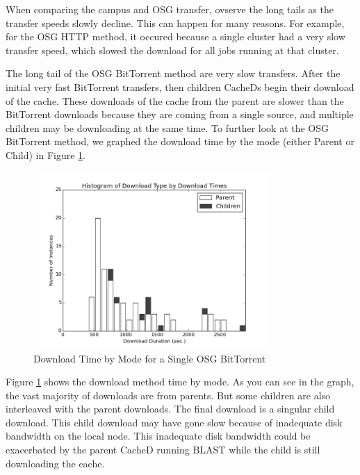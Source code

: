 When comparing the campus and OSG transfer, ovserve the long tails as the transfer speeds slowly decline.  This can happen for many reasons.  For example, for the OSG HTTP method, it occured because a single cluster had a very slow transfer speed, which slowed the download for all jobs running at that cluster.

The long tail of the OSG BitTorrent method are very slow transfers.  After the initial very fast BitTorrent transfers,  then children CacheDs begin their download of the cache.  These downloads of the cache from the parent are slower than the BitTorrent downloads because they are coming from a single source, and multiple children may be downloading at the same time.  To further look at the OSG BitTorrent method, we graphed the download time by the mode (either Parent or Child) in Figure \ref{fig:dowloadmodebittorrent}.

\begin{figure}[h!t]
\centering
\includegraphics[width=0.8\textwidth]{images/osg-aggregatebittorrentmodes-grayscale.png}
\caption{Download Time by Mode for a Single OSG BitTorrent}
\label{fig:dowloadmodebittorrent}
\end{figure}

Figure \ref{fig:dowloadmodebittorrent} shows the download method time by mode.  As you can see in the graph, the vast majority of downloads are from parents.  But some children are also interleaved with the parent downloads.  The final download is a singular child download.  This child download may have gone slow because of inadequate disk bandwidth on the local node.  This inadequate disk bandwidth could be exacerbated by the parent CacheD running BLAST while the child is still downloading the cache.



